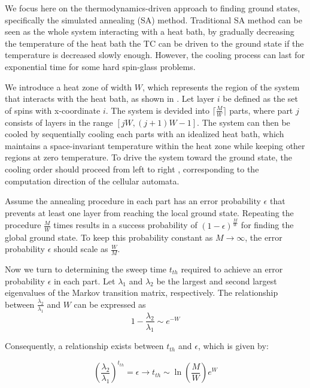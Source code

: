 \documentclass[twocolumn,superscriptaddress,english,showpacs,longbibliography]{revtex4-2}
\begin{document}
We focus here on the thermodynamics-driven approach to finding ground states, 
specifically the simulated annealing (SA) method. Traditional SA method can be seen as the whole system interacting with a heat bath, by gradually decreasing the temperature
of the heat bath the TC can be driven to the ground state if the temperature is decreased slowly enough.
However, the cooling process can last for exponential time for some hard spin-glass problems.

We introduce a heat zone of width $W$, which represents the region of the system that interacts with the heat bath, as shown in .
Let layer $i$ be defined as the set of spins with x-coordinate $i$.
The system is devided into $\lceil\frac{M}{W}\rceil$ parts,
where part $j$ consists of layers in the range $[jW, (j+1)W-1]$.
The system can then be cooled by sequentially cooling each parts with an idealized heat bath, 
which maintains a space-invariant temperature within the heat zone while keeping other regions at zero temperature.
To drive the system toward the ground state, the cooling order should proceed from left to right
, corresponding to the computation direction of the cellular automata.

Assume the annealing procedure in each part has an error probability $\epsilon$ that prevents at least one layer
from reaching the local ground state. 
Repeating the procedure $\frac{M}{W}$ times results in a success probability of $(1 - \epsilon)^{\frac{M}{W}}$ for finding the global ground state. 
To keep this probability constant as $M \to \infty$, the error probability $\epsilon$ should scale as $\frac{W}{M}$.


Now we turn to determining the sweep time $t_{th}$ required to achieve an error probability $\epsilon$ in each part. 
Let $\lambda_1$ and $\lambda_2$ be the largest and second largest eigenvalues of the Markov transition matrix, respectively. 
The relationship between $\frac{\lambda_2}{\lambda_1}$ and $W$ can be expressed as
\begin{equation}
    \label{eq:spectral-gap}
    1 - \frac{\lambda_2}{\lambda_1} \sim e^{-W}
\end{equation}

Consequently, a relationship exists between $t_{th}$ and $\epsilon$, which is given by:

\begin{equation}
    \left( \frac{\lambda_2}{\lambda_1} \right) ^ {t_{th}} = \epsilon \rightarrow t_{th} \sim \ln(\frac{M}{W})e^{W}
\end{equation}
\end{document}
